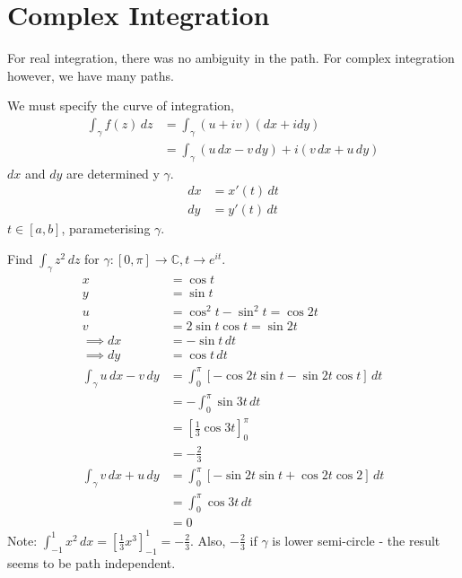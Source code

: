 \documentclass[a4paper, 11pt, normalem]{report}
\newcommand\C{\mathbb{C}}
\begin{document}
\section{Complex Integration}
For real integration, there was no ambiguity in the path. For complex integration however, we have many paths. 

We must specify the curve of integration,
\begin{align}
    \int_\gamma f(z)\,dz &= \int_\gamma (u+iv)(dx + idy) \\
                         &= \int_\gamma (u\,dx - v\,dy) + i(v\,dx + u\,dy)
\end{align}
$dx$ and $dy$ are determined y $\gamma$.
\begin{align}
    dx &= x'(t)\,dt \\
    dy &= y'(t)\,dt 
\end{align}
$t \in [a,b]$, parameterising $\gamma$.

\begin{example}
    Find $\int_\gamma z^2\,dz$ for $\gamma: [0,\pi] \to \C, t \to e^{it}$.
    \begin{align}
        x &= \cos t \\
        y &= \sin t \\
        u &= \cos^2t - \sin^2t = \cos 2t \\
        v &= 2\sin t\cos t = \sin 2t \\
        \implies dx &= -\sin t\, dt \\
        \implies dy &= \cos t\,dt \\
        \int_\gamma u\,dx - v\,dy &= \int_{0}^{\pi} [-\cos 2t \sin t - \sin 2t\cos t]\,dt \\
                                  &= -\int_{0}^{\pi} \sin 3t\,dt \\
                                  &= \left[\frac{1}{3}\cos 3t\right]_{0}^{\pi} \\
                                  &= -\frac{2}{3} \\
        \int_\gamma v\,dx + u\,dy &= \int_{0}^{\pi} [-\sin 2t\sin t + \cos 2t\cos 2]\,dt \\
                                  &= \int_{0}^{\pi} \cos 3t\,dt \\
                                  &= 0
    \end{align}
    Note: $\int_{-1}^{1} x^2\,dx = [\frac{1}{3}x^3]_{-1}^{1} = -\frac{2}{3}$. 
    Also, $-\frac{2}{3}$ if $\gamma$ is lower semi-circle - the result seems to be path independent.
\end{example}
\end{document}
